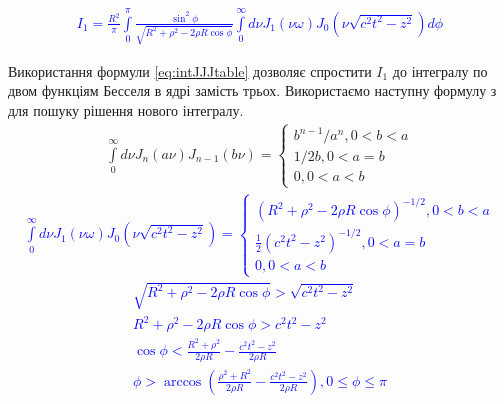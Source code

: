 %
\textcolor{blue}{ \begin{equation*} \begin{aligned}
I_1 = \frac{R^2}{\pi} \int\limits_{0}^{\pi} 
\frac{\sin^2{\phi}}{\sqrt{R^2 + \rho^2 - 2 \rho R \cos \phi}}
\int\limits_{0}^{\infty} d \nu J_1 \left( \nu \omega \right) 
J_0 \left( \nu \sqrt{c^2 t^2 - z^2} \right) d \phi
\end{aligned} \end{equation*} }

Використання формули \eqref{eq:intJJJtable} дозволяє спростити $ I_1 $ до 
інтегралу по двом функціям Бесселя в ядрі замість трьох. Використаємо наступну 
формулу з \cite{imp:Golubovic2013} для пошуку рішення нового інтегралу. 
%
\begin{equation} \begin{aligned} \label{eq:intJJtable}
\int\limits_{0}^{\infty} d \nu
J_n \left( a \nu \right) J_{n-1} \left( b \nu \right) = \begin{cases} 
b^{n-1} / a^n , 0 < b < a \\
1 / 2 b , 0 < a = b \\
0 , 0 < a < b
\end{cases} 
\end{aligned} \end{equation}
%
\textcolor{blue}{ \begin{equation*} \begin{aligned}
\int\limits_{0}^{\infty} d \nu J_1 \left( \nu \omega \right) 
J_0 \left( \nu \sqrt{c^2 t^2 - z^2} \right) = \begin{cases}
\left( R^2 + \rho^2 - 2 \rho R \cos \phi \right)^{-1/2}, 0 < b < a \\
\frac{1}{2} \left( c^2 t^2 - z^2 \right)^{-1/2}, 0 < a = b \\
0 , 0 < a < b
\end{cases} 
\end{aligned} \end{equation*} }
%
\textcolor{blue}{ \begin{equation*} \begin{aligned}
\sqrt{R^2 + \rho^2 - 2 \rho R \cos \phi} > \sqrt{c^2 t^2 - z^2} \\
R^2 + \rho^2 - 2 \rho R \cos \phi > c^2 t^2 - z^2 \\
\cos \phi < \frac{R^2 + \rho^2}{2 \rho R} - \frac{c^2 t^2 - z^2}{2 \rho R} \\
\phi > \arccos \left( \frac{\rho^2 + R^2}{2 \rho R} - 
\frac{c^2 t^2 - z^2}{2 \rho R} \right), 0 \leq \phi \leq \pi
\end{aligned} \end{equation*} }
